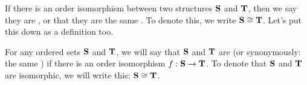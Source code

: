 \documentclass[../../../main.tex]{subfiles}
\begin{document}
If there is an order isomorphism between two structures $\mathbf{S}$ and $\mathbf{T}$, then we say they are , or that they are the same . To denote this, we write $\struct{S} \isomorphic/ \struct{T}$. Let's put this down as a definition too.

\begin{fdefinition}
  \label{def:isomorphic-ordered-sets}
  For any ordered sets $\mathbf{S}$ and $\mathbf{T}$, we will say that $\mathbf{S}$ and $\mathbf{T}$ are  (or synonymously: the same ) if there is an order isomorphism $f: \mathbf{S} \rightarrow \mathbf{T}$. To denote that $\mathbf{S}$ and $\mathbf{T}$ are isomorphic, we will write this: $\struct{S} \isomorphic/ \struct{T}$.
\end{fdefinition}
\end{document}

